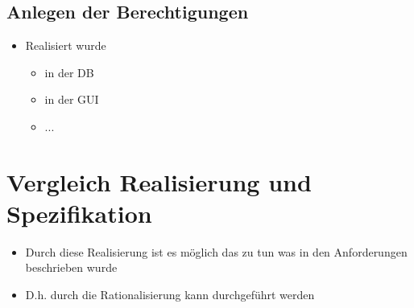 \subsection{Anlegen der Berechtigungen}


\begin{itemize}
	\item Realisiert wurde
	\begin{itemize}
		\item in der DB
		\item in der GUI
		\item ...
	\end{itemize}
\end{itemize}


\section{Vergleich Realisierung und Spezifikation}
\begin{itemize}
	\item Durch diese Realisierung ist es möglich das zu tun was in den Anforderungen beschrieben wurde
	\item D.h. durch die Rationalisierung kann durchgeführt werden
\end{itemize}
